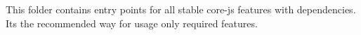 This folder contains entry points for all stable {\ttfamily core-\/js} features with dependencies. It\textquotesingle{}s the recommended way for usage only required features. 